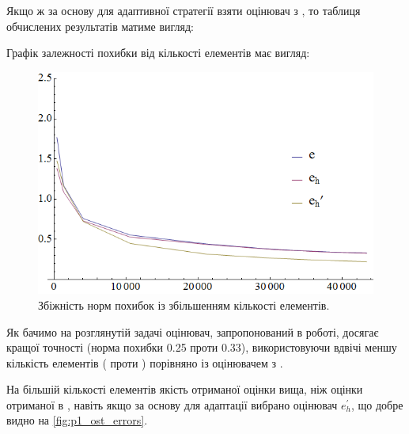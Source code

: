 %
Якщо ж за основу для адаптивної стратегії взяти оцінювач з \cite{OstShynAee11}, то таблиця обчислених результатів матиме вигляд:
%
\clearpage
{}

\clearpage
Графік залежності похибки від кількості елементів має вигляд:

\begin{figure}[H]
	\centering
    \includegraphics[width=\textwidth]{problem1/ost/Plotnb}
    \caption{Збіжність норм похибок із збільшенням кількості елементів.}
    \label{fig:p1_ost_errors}
\end{figure}

Як бачимо на розглянутій задачі оцінювач, запропонований в роботі, досягає кращої точності (норма похибки 0.25 проти 0.33), використовуючи вдвічі меншу кількість елементів ( проти ) порівняно із оцінювачем з \cite{OstShynAee11}.

На більшій кількості елементів якість отриманої оцінки вища, ніж оцінки отриманої в \cite{OstShynAee11},
навіть якщо за основу для адаптації вибрано оцінювач $e_h^\prime$, що добре видно на \autoref{fig:p1_ost_errors}.
